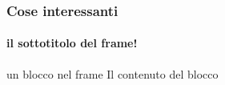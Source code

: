 \begin{frame}
    \frametitle{Cose interessanti}
    \framesubtitle{il sottotitolo del frame!}
    \addtocounter{nframe}{1}
    
    \begin{block}{un blocco nel frame}
        Il contenuto del blocco
    \end{block}
    
\end{frame}